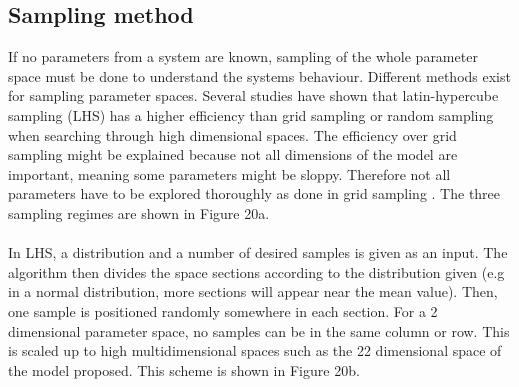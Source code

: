 \subsection{Sampling method}
If no parameters from a system are known, sampling of the whole parameter space must be done to understand the systems behaviour. Different methods exist for sampling parameter spaces. Several studies have shown that latin-hypercube sampling (LHS) has a higher efficiency than grid sampling or random sampling when searching through high dimensional spaces. The efficiency over grid sampling might be explained because not all dimensions of the model are important, meaning some parameters might be sloppy. Therefore not all parameters have to be explored thoroughly as done in grid sampling \parencite{Iman2014, Bergstra2012}. The three sampling regimes are shown in Figure 20a.\\\\
In LHS, a distribution and a number of desired samples is given as an input. The algorithm then divides the space sections according to the distribution given (e.g in a normal distribution, more sections will appear near the mean value).  Then, one sample is positioned randomly somewhere in each section. For a 2 dimensional parameter space, no samples can be in the same column or row. This is scaled up to high multidimensional spaces such as the 22 dimensional space of the model proposed. This scheme is shown in Figure 20b.
